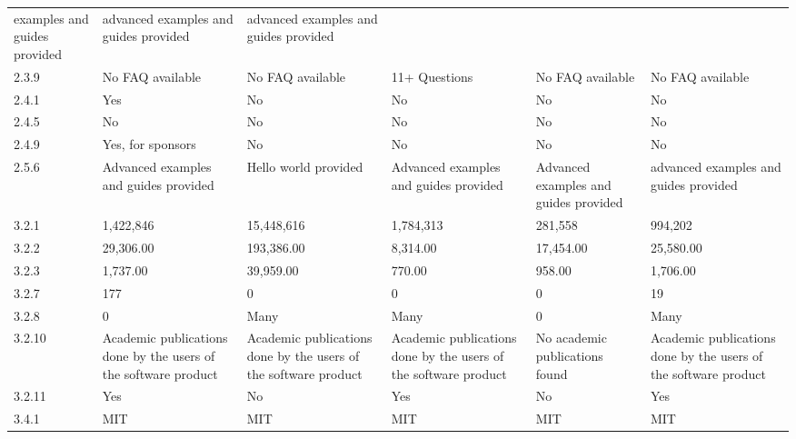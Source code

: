 \begin{longtable}[]{|p{1.5cm}p{2.25cm}p{2.25cm}p{2.25cm}p{2.25cm}p{2cm}|}
examples and guides provided & advanced examples and
guides provided & advanced examples and guides provided \\
2.3.9 & No FAQ available & No FAQ available & 11+ Questions & No FAQ
available & No FAQ available \\
2.4.1 & Yes & No & No & No & No \\
2.4.5 & No & No & No & No & No \\
2.4.9 & Yes, for sponsors & No & No & No & No \\
2.5.6 & Advanced examples and guides provided &
Hello world provided & Advanced
examples and guides provided & Advanced examples and
guides provided & advanced examples and guides provided \\
3.2.1 & 1,422,846 & 15,448,616 & 1,784,313 & 281,558 & 994,202 \\
3.2.2 & 29,306.00 & 193,386.00 & 8,314.00 & 17,454.00 & 25,580.00 \\
3.2.3 & 1,737.00 & 39,959.00 & 770.00 & 958.00 & 1,706.00 \\
3.2.7 & 177 & 0 & 0 & 0 & 19 \\
3.2.8 & 0 & Many & Many & 0 & Many \\
3.2.10 & Academic publications done by the users of the software product
& Academic publications done by the users of the software product &
Academic publications done by the users of the software product & No
academic publications found & Academic publications done by the users of
the software product \\
3.2.11 & Yes & No & Yes & No & Yes \\
3.4.1 & MIT & MIT & MIT & MIT & MIT \\
\bottomrule
\end{longtable}
